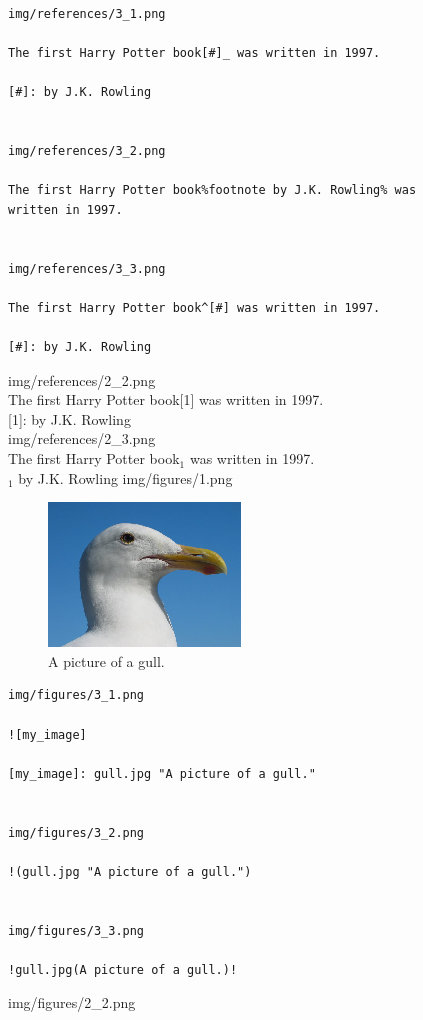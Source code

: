 \documentclass[14pt]{article}
\begin{document}
\newpage
\begin{verbatim}
img/references/3_1.png

The first Harry Potter book[#]_ was written in 1997.

[#]: by J.K. Rowling


img/references/3_2.png

The first Harry Potter book%footnote by J.K. Rowling% was
written in 1997.


img/references/3_3.png

The first Harry Potter book^[#] was written in 1997.

[#]: by J.K. Rowling

\end{verbatim}
\noindent
img/references/2\_2.png\\[.5cm]
The first Harry Potter book[1] was written in 1997.\\[1cm]
[1]: by J.K. Rowling\\[1cm]
img/references/2\_3.png\\[.5cm]
The first Harry Potter book$_1$ was written in 1997.\\[1cm]
$_1$ by J.K. Rowling
\newpage
img/figures/1.png\\[.5cm]
\begin{figure}[H]
\begin{center}
\includegraphics[scale=1]{gull.png}
\caption{A picture of a gull.}
\end{center}
\end{figure}
\noindent
\begin{verbatim}
img/figures/3_1.png

![my_image]

[my_image]: gull.jpg "A picture of a gull."


img/figures/3_2.png

!(gull.jpg "A picture of a gull.")


img/figures/3_3.png

!gull.jpg(A picture of a gull.)!

\end{verbatim}
\newpage
\noindent
img/figures/2\_2.png\\[.5cm]
\end{document}
